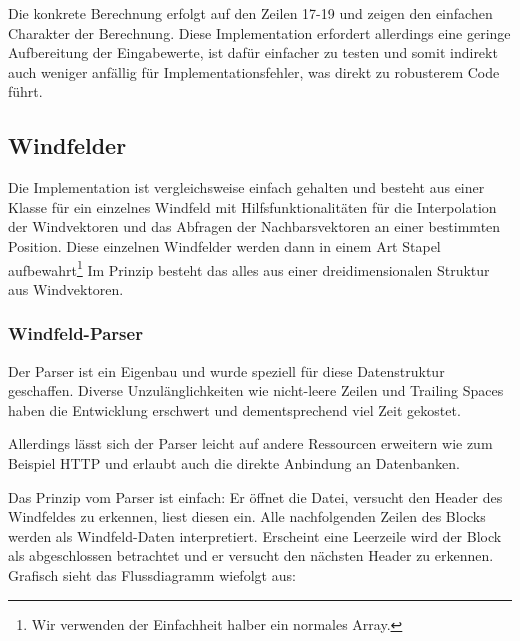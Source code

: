  
Die konkrete Berechnung erfolgt auf den Zeilen 17-19 und zeigen den einfachen
Charakter der Berechnung. Diese Implementation erfordert allerdings eine
geringe Aufbereitung der Eingabewerte, ist dafür einfacher zu testen und somit
indirekt auch weniger anfällig für Implementationsfehler, was direkt zu
robusterem Code führt.

\subsection{Windfelder}
Die Implementation ist vergleichsweise einfach gehalten und besteht aus einer
Klasse für ein einzelnes Windfeld mit Hilfsfunktionalitäten für die
Interpolation der Windvektoren und das Abfragen der Nachbarsvektoren an einer
bestimmten Position. Diese einzelnen Windfelder werden dann in einem Art Stapel
aufbewahrt\footnote{Wir verwenden der Einfachheit halber ein normales Array.}
Im Prinzip besteht das alles aus einer dreidimensionalen Struktur aus
Windvektoren.

\subsubsection{Windfeld-Parser}
Der Parser ist ein Eigenbau und wurde speziell für diese Datenstruktur
geschaffen. Diverse Unzulänglichkeiten wie nicht-leere Zeilen und Trailing
Spaces haben die Entwicklung erschwert und dementsprechend viel Zeit gekostet.

Allerdings lässt sich der Parser leicht auf andere Ressourcen erweitern wie zum
Beispiel HTTP und erlaubt auch die direkte Anbindung an Datenbanken.

Das Prinzip vom Parser ist einfach: Er öffnet die Datei, versucht den Header
des Windfeldes zu erkennen, liest diesen ein. Alle nachfolgenden Zeilen des
Blocks werden als Windfeld-Daten interpretiert. Erscheint eine Leerzeile wird
der Block als abgeschlossen betrachtet und er versucht den nächsten Header zu
erkennen. Grafisch sieht das Flussdiagramm wiefolgt aus:

\begin{center}
\end{center}



